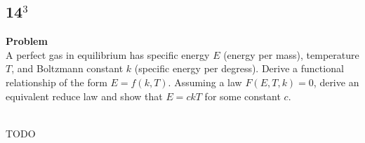 \documentclass[12pt]{article}
\newenvironment{Ex}{\textbf{Problem}\vspace{.75em}\\}{}
\begin{document}
\subsection{14$^3$}
\begin{Ex}
  A perfect gas in equilibrium has specific energy $E$ (energy per mass),
  temperature $T$, and Boltzmann constant $k$ (specific energy per degress).
  Derive a functional relationship of the form $E=f(k,T)$. Assuming a law
  $F(E,T,k)=0$, derive an equivalent reduce law and show that $E=ckT$ for some
  constant $c$.
  \begin{solution} \hfill \vspace{.75em} \\
    {\huge \color{red}TODO}
  \end{solution}
\end{Ex}
\end{document}
